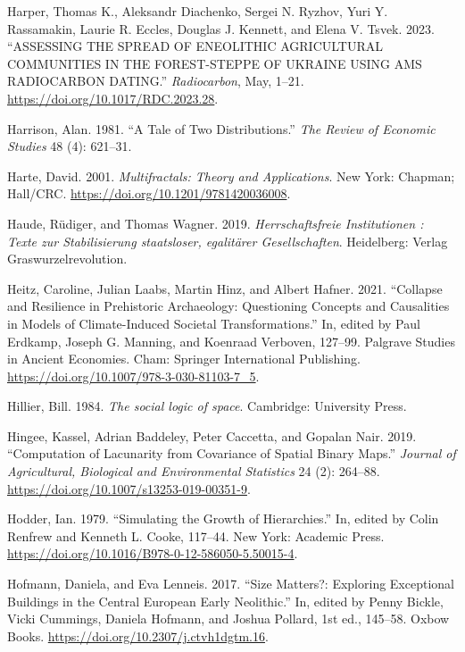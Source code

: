 \documentclass[
  12pt,
  a4paper, twoside]{book}
\newlength{\cslhangindent}
\newlength{\cslentryspacingunit} %
\newenvironment{CSLReferences}[2] %
 {%
  \setlength{\parindent}{0pt}
  \ifodd #1
  \let\oldpar\par
  \def\par{\hangindent=\cslhangindent\oldpar}
  \fi
  \setlength{\parskip}{#2\cslentryspacingunit}
 }%
 {}
\begin{document}
\begin{CSLReferences}{1}{0}
\leavevmode{}%
Harper, Thomas K., Aleksandr Diachenko, Sergei N. Ryzhov, Yuri Y. Rassamakin, Laurie R. Eccles, Douglas J. Kennett, and Elena V. Tsvek. 2023. {``ASSESSING THE SPREAD OF ENEOLITHIC AGRICULTURAL COMMUNITIES IN THE FOREST-STEPPE OF UKRAINE USING AMS RADIOCARBON DATING.''} \emph{Radiocarbon}, May, 1--21. \url{https://doi.org/10.1017/RDC.2023.28}.

\leavevmode{}%
Harrison, Alan. 1981. {``A Tale of Two Distributions.''} \emph{The Review of Economic Studies} 48 (4): 621--31.

\leavevmode{}%
Harte, David. 2001. \emph{Multifractals: Theory and Applications}. New York: Chapman; Hall/CRC. \url{https://doi.org/10.1201/9781420036008}.

\leavevmode{}%
Haude, Rüdiger, and Thomas Wagner. 2019. \emph{Herrschaftsfreie Institutionen : Texte zur Stabilisierung staatsloser, egalitärer Gesellschaften}. Heidelberg: Verlag Graswurzelrevolution.

\leavevmode{}%
Heitz, Caroline, Julian Laabs, Martin Hinz, and Albert Hafner. 2021. {``Collapse and Resilience in Prehistoric Archaeology: Questioning Concepts and Causalities in Models of Climate-Induced Societal Transformations.''} In, edited by Paul Erdkamp, Joseph G. Manning, and Koenraad Verboven, 127--99. Palgrave Studies in Ancient Economies. Cham: Springer International Publishing. \url{https://doi.org/10.1007/978-3-030-81103-7_5}.

\leavevmode{}%
Hillier, Bill. 1984. \emph{The social logic of space}. Cambridge: University Press.

\leavevmode{}%
Hingee, Kassel, Adrian Baddeley, Peter Caccetta, and Gopalan Nair. 2019. {``Computation of Lacunarity from Covariance of Spatial Binary Maps.''} \emph{Journal of Agricultural, Biological and Environmental Statistics} 24 (2): 264--88. \url{https://doi.org/10.1007/s13253-019-00351-9}.

\leavevmode{}%
Hodder, Ian. 1979. {``Simulating the Growth of Hierarchies.''} In, edited by Colin Renfrew and Kenneth L. Cooke, 117--44. New York: Academic Press. \url{https://doi.org/10.1016/B978-0-12-586050-5.50015-4}.

\leavevmode{}%
Hofmann, Daniela, and Eva Lenneis. 2017. {``Size Matters?: Exploring Exceptional Buildings in the Central European Early Neolithic.''} In, edited by Penny Bickle, Vicki Cummings, Daniela Hofmann, and Joshua Pollard, 1st ed., 145--58. Oxbow Books. \url{https://doi.org/10.2307/j.ctvh1dgtm.16}.


\end{CSLReferences}
\end{document}
